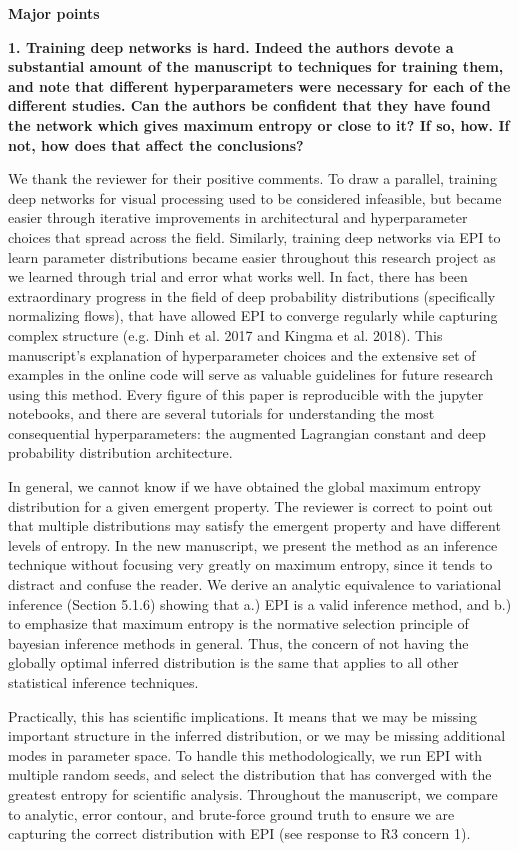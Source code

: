 \documentclass[11pt,a4paper]{article}
\begin{document}
\textbf{Major points }

\textbf{1. Training deep networks is hard. Indeed the authors devote a substantial amount of the manuscript to techniques for training them, and note that different hyperparameters were necessary for each of the different studies. Can the authors be confident that they have found the network which gives maximum entropy or close to it? If so, how. If not, how does that affect the conclusions? }

We thank the reviewer for their positive comments.  
To draw a parallel, training deep networks for visual processing used to be considered infeasible, but became easier through iterative improvements in architectural and hyperparameter choices that spread across the field.  
Similarly, training deep networks via EPI to learn parameter distributions became easier throughout this research project as we learned through trial and error what works well.  
In fact, there has been extraordinary progress in the field of deep probability distributions (specifically normalizing flows), that have allowed EPI to converge regularly while capturing complex structure (e.g. Dinh et al. 2017 and Kingma et al. 2018).  
This manuscript's explanation of hyperparameter choices and the extensive set of examples in the online code will serve as valuable guidelines for future research using this method.
Every figure of this paper is reproducible with the jupyter notebooks, and there are several tutorials for understanding the most consequential hyperparameters: the augmented Lagrangian constant and deep probability distribution architecture.  

In general, we cannot know if we have obtained the global maximum entropy distribution for a given emergent property.  
The reviewer is correct to point out that multiple distributions may satisfy the emergent property and have different levels of entropy.  
In the new manuscript, we present the method as an inference technique without focusing very greatly on maximum entropy, since it tends to distract and confuse the reader.  
We derive an analytic equivalence to variational inference (Section 5.1.6) showing that a.) EPI is a valid inference method, and b.) to emphasize that maximum entropy is the normative selection principle of bayesian inference methods in general. 
Thus, the concern of not having the globally optimal inferred distribution is the same that applies to all other statistical inference techniques.

Practically, this has scientific implications.  
It means that we may be missing important structure in the inferred distribution, or we may be missing additional modes in parameter space.  
To handle this methodologically, we run EPI with multiple random seeds, and select the distribution that has converged with the greatest entropy for scientific analysis.
Throughout the manuscript, we compare to analytic, error contour, and brute-force ground truth to ensure we are capturing the correct distribution with EPI (see response to R3 concern 1).
\end{document}

